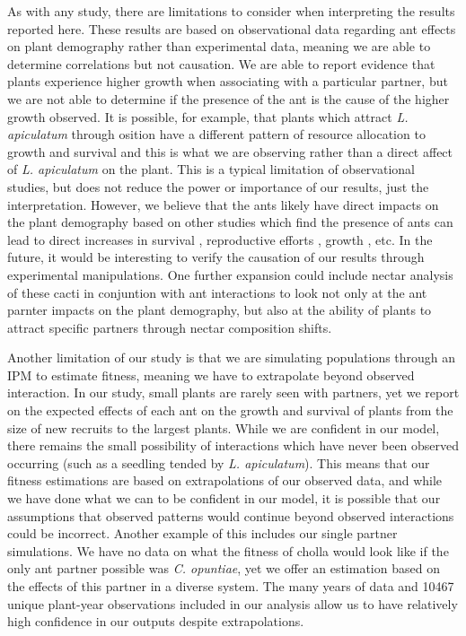 \documentclass[11pt]{article}
\begin{document}
As with any study, there are limitations to consider when interpreting the results reported here.
These results are based on observational data regarding ant effects on plant demography rather than experimental data, meaning we are able to determine correlations but not causation.
We are able to report evidence that plants experience higher growth when associating with a particular partner, but we are not able to determine if the presence of the ant is the cause of the higher growth observed.
It is possible, for example, that plants which attract \textit{L. apiculatum} through osition have a different pattern of resource allocation to growth and survival and this is what we are observing rather than a direct affect of \textit{L. apiculatum} on the plant.
This is a typical limitation of observational studies, but does not reduce the power or importance of our results, just the interpretation.
However, we believe that the ants likely have direct impacts on the plant demography based on other studies which find the presence of ants can lead to direct increases in survival \citep{Beattie1985}, reproductive efforts \citep{Ford2015}, growth \citep{Frederickson2005}, etc.
In the future, it would be interesting to verify the causation of our results through experimental manipulations.
One further expansion could include nectar analysis of these cacti in conjuntion with ant interactions to look not only at the ant parnter impacts on the plant demography, but also at the ability of plants to attract specific partners through nectar composition shifts. 

Another limitation of our study is that we are simulating populations through an IPM to estimate fitness, meaning we have to extrapolate beyond observed interaction.
In our study, small plants are rarely seen with partners, yet we report on the expected effects of each ant on the growth and survival of plants from the size of new recruits to the largest plants. 
While we are confident in our model, there remains the small possibility of interactions which have never been observed occurring (such as a seedling tended by \textit{L. apiculatum}).
This means that our fitness estimations are based on extrapolations of our observed data, and while we have done what we can to be confident in our model, it is possible that our assumptions that observed patterns would continue beyond observed interactions could be incorrect.
Another example of this includes our single partner simulations.
We have no data on what the fitness of cholla would look like if the only ant partner possible was \textit{C. opuntiae}, yet we offer an estimation based on the effects of this partner in a diverse system.
The many years of data and 10467 unique plant-year observations included in our analysis allow us to have relatively high confidence in our outputs despite extrapolations.
\end{document}

